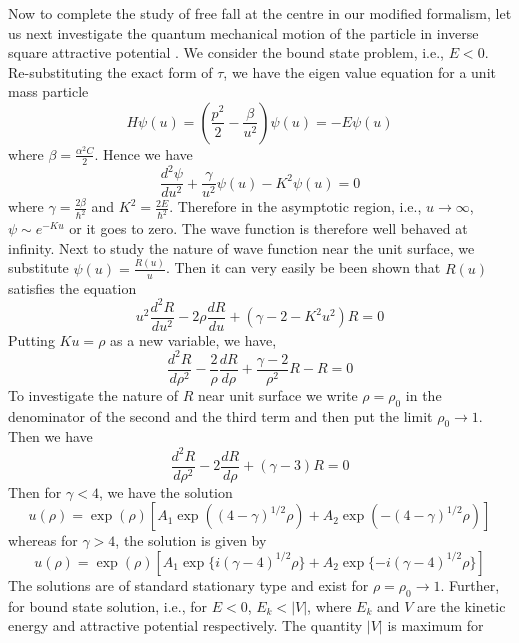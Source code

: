 \documentclass[12pt]{article}
\begin{document}
Now to complete the study of free fall at the centre in our modified formalism, let us next 
investigate the quantum mechanical motion of the particle in inverse square 
attractive potential \cite{R13,R14,R15}. We consider the bound state problem, i.e., $E<0$. Re-substituting the 
exact form of $\tau$, we have the eigen value equation for a unit mass particle
\begin{equation}
H\psi(u)=(\frac{p^2}{2}-\frac{\beta}{u^2})\psi(u)=-E\psi(u)
\end{equation}
where $\beta=\frac{\alpha^2C}{2}$.
Hence we have
\begin{equation} 
\frac{d^2\psi}{du^2}+\frac{\gamma}{u^2}\psi(u)-K^2\psi(u)=0
\end{equation}
where $\gamma=\frac{2\beta}{\hbar^2}$ and $K^2=\frac{2E}{\hbar^2}$.
Therefore in the asymptotic region, i.e., $u\rightarrow \infty$, $\psi\sim e^{-Ku}$ or it goes
to zero. The wave function is therefore well behaved at infinity. Next to study the nature of wave function near the unit surface, we substitute
$\psi(u)=\frac{R(u)}{u}$.
Then it can very easily be been shown that $R(u)$ satisfies the equation
\begin{equation}
u^2\frac{d^2R}{du^2}-2\rho\frac{dR}{du}+(\gamma-2-K^2 u^2)R=0
\end{equation}
Putting $Ku=\rho$ as a new variable, we have,
\begin{equation}
\frac{d^2R}{d\rho^2}-\frac{2}{\rho}\frac{dR}{d\rho}+\frac{\gamma-2}{\rho ^2}R-R=0
\end{equation}
To investigate the nature of $R$ near unit surface we write $\rho=\rho_0$ in the denominator 
of the second and the third term and then put the limit $\rho_0\rightarrow 1$.
Then we have
\begin{equation}
\frac{d^2R}{d\rho^2}-2\frac{dR}{d\rho}+(\gamma-3)R=0
\end{equation}
Then for $\gamma<4$, we have the solution
\begin{equation}
u(\rho)=\exp(\rho)[A_1 \exp((4-\gamma)^{1/2}\rho)+A_2
\exp(-(4-\gamma)^{1/2}\rho)]
\end{equation}
whereas for $\gamma>4$, the solution is given by
\begin{equation}
u(\rho)=\exp(\rho)[A_1 \exp\{i(\gamma -4)^{1/2}\rho\}+
A_2\exp\{-i(\gamma -4)^{1/2}\rho\}]
\end{equation}
The solutions are of standard stationary type and exist for $\rho=\rho_0\rightarrow 1$.
Further, for bound state solution, i.e., for $E<0$, $E_k<|V|$, where $E_k$ and $V$ are the 
kinetic energy and attractive potential respectively. The quantity $|V|$ is maximum for 
\end{document}
